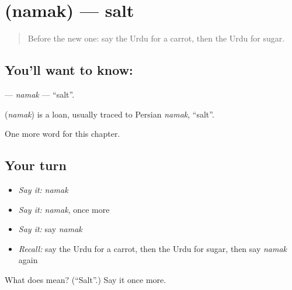 \section[\texorpdfstring{\ur{نمک} (namak)}{نمک (namak)}]{ (namak) — salt}

\label{lesson:UR-C55-namak}



\begin{quote}
Before the new one: say the Urdu for a carrot, then the Urdu for sugar.
\end{quote}

\subsection*{You'll want to know: }
\textbf{} — \emph{namak} — \textquotedblleft{}salt\textquotedblright{}.

\begin{cousinweb}
\textbf{} (\emph{namak}) is a loan, usually traced to Persian \emph{namak}, \textquotedblleft{}salt\textquotedblright{}.
\end{cousinweb}

\begin{grammarlens}[title={What you've built}]
One more word for this chapter.
\end{grammarlens}

\subsection*{Your turn}
\begin{itemize}
\raggedright
  \item \emph{Say it:} \emph{namak}
  \item \emph{Say it:} \emph{namak}, once more
  \item \emph{Say it:} say \emph{namak}
  \item \emph{Recall:} say the Urdu for a carrot, then the Urdu for sugar, then say \emph{namak} again
\end{itemize}

\begin{tcolorbox}[breakable,colback=teal!4,colframe=teal!35!black,title={Before you move on}]
What does  mean? (\textquotedblleft{}Salt\textquotedblright{}.) Say it once more.
\end{tcolorbox}
